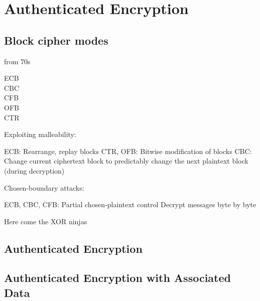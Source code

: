 \chapter{Authenticated Encryption}


\section{Block cipher modes}

from 70s

\begin{description}
  \item[ECB]
  \item[CBC]
  \item[CFB]
  \item[OFB]
  \item[CTR]
\end{description}


Exploiting malleability:

ECB: Rearrange, replay blocks
CTR, OFB: Bitwise modification of blocks
CBC: Change current ciphertext block to predictably change the next plaintext block (during decryption)

Chosen-boundary attacks:

ECB, CBC, CFB: Partial chosen-plaintext control
Decrypt messages byte by byte

Here come the XOR ninjas

\section{Authenticated Encryption}
\section{Authenticated Encryption with Associated Data}






